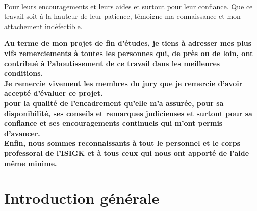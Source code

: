 \documentclass[12 pt ]{report}
\begin{document}
\begin{center}
\Large\textbf{\selectfont {A}}\\
\Large\textbf{\selectfont {Mes frères, mes amis et mes enseignants}}
\end{center}
 Pour leurs encouragements et leurs aides et surtout pour leur confiance.
Que ce travail soit à la hauteur de leur patience, témoigne ma connaissance et mon attachement indéfectible.
 
\newpage
\thispagestyle{empty}
\begin{center}
\Huge\textbf{\selectfont {Remerciement}}
\end{center}

\textbf{Au terme de mon projet de fin d’études, je tiens à adresser mes plus vifs remerciements à toutes les personnes qui, de près ou de loin, ont contribué à l’aboutissement de ce travail dans les meilleures conditions.}
 \\
 
 \textbf{Je remercie vivement les membres du jury que je remercie d’avoir accepté d’évaluer ce projet.}
 \\

\textbf{pour la qualité de l’encadrement qu’elle m’a assurée, pour sa disponibilité, ses conseils et remarques judicieuses et surtout pour sa confiance et ses encouragements continuels qui m’ont permis d’avancer.} 
\\

\textbf{Enfin, nous sommes reconnaissants à tout le personnel et le corps professoral de l’ISIGK et à tous ceux qui nous ont apporté de l’aide même minime.}
  

{
    \fancyhead{}
    \fancyfoot{}
}
 \renewcommand\thepage{}
\tableofcontents
\renewcommand\thepage{\arabic{page}}  
{
    \fancyhead{}
    \fancyfoot[C]{\thepage}
}
\renewcommand\thepage{}
\newpage
\renewcommand\thepage{\arabic{page}}  
{
    \fancyhead{}
    \fancyfoot[C]{\thepage}
}
\renewcommand\thepage{}
\listoffigures
\renewcommand\thepage{\arabic{page}}  
{
    \fancyhead{}
    \fancyfoot[C]{\thepage}
}
\renewcommand\thepage{}
\newpage
\renewcommand\thepage{\arabic{page}}  
{
    \fancyhead{}
    \fancyfoot[C]{\thepage}
}
\newpage

\newpage
\renewcommand\thepage{}
\listoftables
\thispagestyle{empty}
\newpage
\renewcommand{\thepage}{\arabic{page}}
\setcounter{page}{1}
\chapter*{Introduction générale}  
\end{document}
